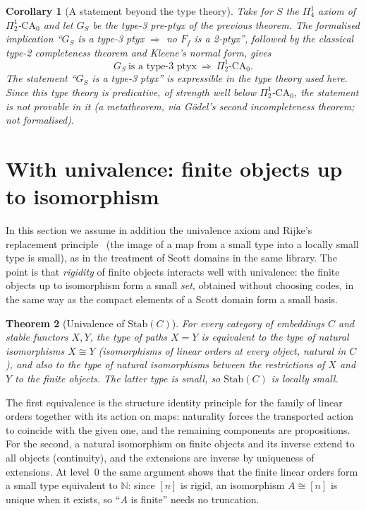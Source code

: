 \documentclass[11pt]{article}
\newtheorem{theorem}{Theorem}[section]
\newtheorem{corollary}[theorem]{Corollary}
\theoremstyle{definition}
\theoremstyle{remark}
\newcommand{\Stab}{\mathrm{Stab}}
\begin{document}
\begin{corollary}[A statement beyond the type theory]
Take for $S$ the $\Pi^1_4$ axiom of $\Pi^1_2$-$\mathrm{CA}_0$ and let $G_S$ be
the type-3 pre-ptyx of the previous theorem. The formalised implication
``$G_S$ is a type-3 ptyx $\Rightarrow$ no $F_f$ is a 2-ptyx'', followed by
the classical type-2 completeness theorem and Kleene's normal form, gives
\[ G_S\ \text{is a type-3 ptyx}\ \Longrightarrow\ \Pi^1_2\text{-}\mathrm{CA}_0 .\]
The statement ``$G_S$ is a type-3 ptyx'' is expressible in the type theory
used here. Since this type theory is predicative, of strength well below
$\Pi^1_2$-$\mathrm{CA}_0$, the statement is not provable in it (a
metatheorem, via G\"odel's second incompleteness theorem; not formalised).
\end{corollary}

\section{With univalence: finite objects up to isomorphism}\label{sec:ua}

In this section we assume in addition the univalence axiom and Rijke's
replacement principle~\cite{Rij} (the image of a map from a small type
into a locally small type is small), as in the treatment of Scott domains
in the same library. The point is that \emph{rigidity} of finite objects
interacts well with univalence: the finite objects up to isomorphism form a
small \emph{set}, obtained without choosing codes, in the same way as the
compact elements of a Scott domain form a small basis.

\begin{theorem}[Univalence of $\Stab(C)$]
For every category of embeddings $C$ and stable functors $X,Y$, the type of
paths $X=Y$ is equivalent to the type of natural isomorphisms $X\cong Y$
(isomorphisms of linear orders at every object, natural in $C$), and also
to the type of natural isomorphisms between the restrictions of $X$ and $Y$
to the finite objects. The latter type is small, so $\Stab(C)$ is locally
small.
\end{theorem}

The first equivalence is the structure identity principle for the family
of linear orders together with its action on maps: naturality forces the
transported action to coincide with the given one, and the remaining
components are propositions. For the second, a natural isomorphism on
finite objects and its inverse extend to all objects (continuity), and the
extensions are inverse by uniqueness of extensions. At level~$0$ the same
argument shows that the finite linear orders form a small type equivalent
to $\mathbb{N}$: since $[n]$ is rigid, an isomorphism $A\cong[n]$ is unique
when it exists, so ``$A$ is finite'' needs no truncation.
\end{document}
